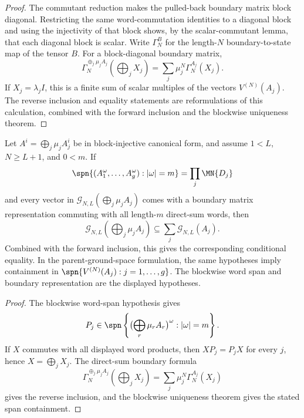 \begin{proof}
    \notready
    The commutant reduction makes the pulled-back boundary matrix block
    diagonal. Restricting the same word-commutation identities to a diagonal
    block and using the injectivity of that block shows, by the scalar-commutant
    lemma, that each diagonal block is scalar. Write $\Gamma_N^B$ for the
    length-$N$ boundary-to-state map of the tensor $B$. For a block-diagonal
    boundary matrix,
    \[
        \Gamma_N^{\oplus_j\mu_j A_j}\!\left(\bigoplus_j X_j\right)
        =
        \sum_j \mu_j^N \Gamma_N^{A_j}(X_j).
    \]
    If $X_j=\lambda_j I$, this is a finite sum of scalar multiples of the
    vectors $V^{(N)}(A_j)$. The reverse inclusion and equality statements are
    reformulations of this calculation, combined with the forward inclusion and
    the blockwise uniqueness theorem.
\end{proof}

\begin{lemma}
    \label{lem:conditional_block_split_from_product_word_span}
    \notready
    Let $A^i=\bigoplus_j\mu_j A_j^i$ be in block-injective canonical form, and
    assume $1<L$, $N \ge L+1$, and $0<m$. If
    \[
        \spn\{(A_1^\omega,\ldots,A_g^\omega): |\omega|=m\}
        =
        \prod_j \MN{D_j}
    \]
    and
    every vector in
    $\mathcal G_{N,L}\!\left(\bigoplus_j \mu_j A_j\right)$ comes with a boundary
    matrix representation commuting with all length-$m$ direct-sum words, then
    \[
        \mathcal G_{N,L}\!\left(\bigoplus_j \mu_j A_j\right)
        \subseteq \sum_j \mathcal G_{N,L}(A_j).
    \]
    Combined with the forward inclusion, this gives the corresponding conditional
    equality. In the parent-ground-space formulation, the same hypotheses imply
    containment in $\spn\{V^{(N)}(A_j): j=1,\ldots,g\}$. The blockwise word span
    and boundary representation are the displayed hypotheses.
\end{lemma}

\begin{proof}
    \notready
    The blockwise word-span hypothesis gives
    \[
        P_j\in
        \spn\left\{
        \bigl(\bigoplus_r\mu_r A_r\bigr)^\omega:|\omega|=m
        \right\}.
    \]
    If $X$ commutes with all displayed word products, then
    $XP_j=P_jX$ for every $j$, hence $X=\bigoplus_jX_j$. The direct-sum
    boundary formula
    \[
        \Gamma_N^{\oplus_j\mu_j A_j}\!\left(\bigoplus_jX_j\right)
        =
        \sum_j\mu_j^N\Gamma_N^{A_j}(X_j)
    \]
    gives the reverse inclusion, and the blockwise uniqueness theorem gives the
    stated span containment.
\end{proof}

